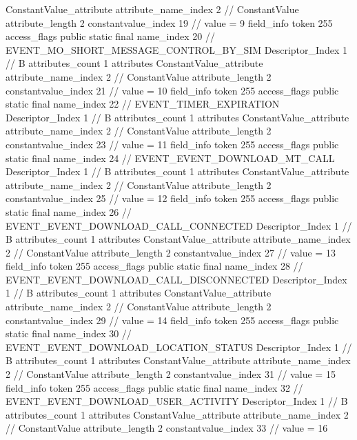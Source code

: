 {{{{{{				ConstantValue_attribute {
					attribute_name_index	2		// ConstantValue
					attribute_length	2
					constantvalue_index	19		// value = 9
				}
				}
			}
			field_info {
				token	255
				access_flags	public static final
				name_index	20		// EVENT_MO_SHORT_MESSAGE_CONTROL_BY_SIM
				Descriptor_Index	1		// B
				attributes_count	1
				attributes {
				ConstantValue_attribute {
					attribute_name_index	2		// ConstantValue
					attribute_length	2
					constantvalue_index	21		// value = 10
				}
				}
			}
			field_info {
				token	255
				access_flags	public static final
				name_index	22		// EVENT_TIMER_EXPIRATION
				Descriptor_Index	1		// B
				attributes_count	1
				attributes {
				ConstantValue_attribute {
					attribute_name_index	2		// ConstantValue
					attribute_length	2
					constantvalue_index	23		// value = 11
				}
				}
			}
			field_info {
				token	255
				access_flags	public static final
				name_index	24		// EVENT_EVENT_DOWNLOAD_MT_CALL
				Descriptor_Index	1		// B
				attributes_count	1
				attributes {
				ConstantValue_attribute {
					attribute_name_index	2		// ConstantValue
					attribute_length	2
					constantvalue_index	25		// value = 12
				}
				}
			}
			field_info {
				token	255
				access_flags	public static final
				name_index	26		// EVENT_EVENT_DOWNLOAD_CALL_CONNECTED
				Descriptor_Index	1		// B
				attributes_count	1
				attributes {
				ConstantValue_attribute {
					attribute_name_index	2		// ConstantValue
					attribute_length	2
					constantvalue_index	27		// value = 13
				}
				}
			}
			field_info {
				token	255
				access_flags	public static final
				name_index	28		// EVENT_EVENT_DOWNLOAD_CALL_DISCONNECTED
				Descriptor_Index	1		// B
				attributes_count	1
				attributes {
				ConstantValue_attribute {
					attribute_name_index	2		// ConstantValue
					attribute_length	2
					constantvalue_index	29		// value = 14
				}
				}
			}
			field_info {
				token	255
				access_flags	public static final
				name_index	30		// EVENT_EVENT_DOWNLOAD_LOCATION_STATUS
				Descriptor_Index	1		// B
				attributes_count	1
				attributes {
				ConstantValue_attribute {
					attribute_name_index	2		// ConstantValue
					attribute_length	2
					constantvalue_index	31		// value = 15
				}
				}
			}
			field_info {
				token	255
				access_flags	public static final
				name_index	32		// EVENT_EVENT_DOWNLOAD_USER_ACTIVITY
				Descriptor_Index	1		// B
				attributes_count	1
				attributes {
				ConstantValue_attribute {
					attribute_name_index	2		// ConstantValue
					attribute_length	2
					constantvalue_index	33		// value = 16
}}}}}}}

